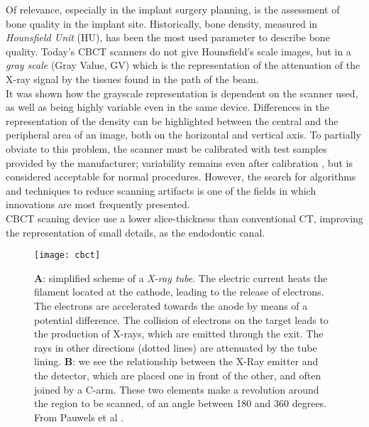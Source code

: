 Of relevance, especially in the implant surgery planning, is the assessment of bone quality in the implant site. Historically, bone density, measured in \emph{Hounsfield Unit} (HU), has been the most used parameter to describe bone quality. Today's CBCT scanners do not give Hounsfield's scale images, but in a \emph{gray scale} (Gray Value, GV) which is the representation of the attenuation of the X-ray signal by the tissues found in the path of the beam. \\ It was shown how the grayscale representation is dependent on the scanner used, as well as being highly variable even in the same device. Differences in the representation of the density can be highlighted between the central and the peripheral area of an image, both on the horizontal and vertical axis. To partially obviate to this problem, the scanner must be calibrated with test samples provided by the manufacturer; variability remains even after calibration \parencite{Reference17}, but is considered acceptable for normal procedures. However, the search for algorithms and techniques to reduce scanning artifacts is one of the fields in which innovations \parencite{Reference19} are most frequently presented.\\
CBCT scaning device use a lower slice-thickness than conventional CT, improving the representation of small details, as the endodontic canal.

\begin{figure}[h]
    \centering
    \texttt{[image: cbct]}
    \caption{\textbf{A}: simplified scheme of a \emph{X-ray tube}. The electric current heats the filament located at the cathode, leading to the release of electrons. The electrons are accelerated towards the anode by means of a potential difference. The collision of electrons on the target leads to the production of X-rays, which are emitted through the exit. The rays in other directions (dotted lines) are attenuated by the tube lining. \textbf{B}: we see the relationship between the X-Ray emitter and the detector, which are placed one in front of the other, and often joined by a C-arm. These two elements make a revolution around the region to be scanned, of an angle between 180 and 360 degrees. From Pauwels et al \parencite{Reference11}.}
    \label{fig: CBCT}
\end{figure}

